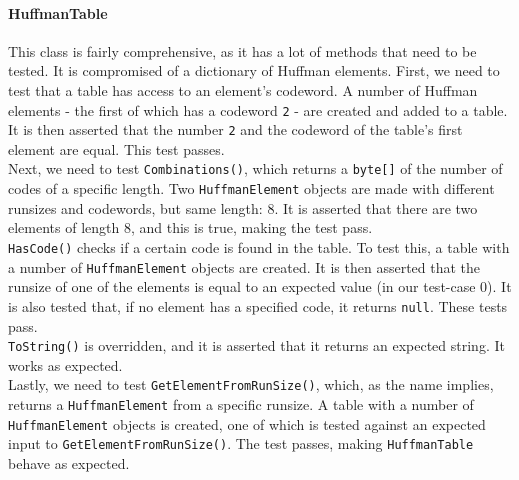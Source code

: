 \paragraph*{HuffmanTable}
This class is fairly comprehensive, as it has a lot of methods that need to be tested.
It is compromised of a dictionary of Huffman elements.
First, we need to test that a table has access to an element's codeword.
A number of Huffman elements - the first of which has a codeword \lstinline|2| - are created and added to a table.
It is then asserted that the number \lstinline|2| and the codeword of the table's first element are equal.
This test passes.\\
Next, we need to test \lstinline|Combinations()|, which returns a \lstinline|byte[]| of the number of codes of a specific length.
Two \lstinline|HuffmanElement| objects are made with different runsizes and codewords, but same length: 8.
It is asserted that there are two elements of length 8, and this is true, making the test pass.\\
\lstinline|HasCode()| checks if a certain code is found in the table.
To test this, a table with a number of \lstinline|HuffmanElement| objects are created.
It is then asserted that the runsize of one of the elements is equal to an expected value (in our test-case 0).
It is also tested that, if no element has a specified code, it returns \lstinline|null|.
These tests pass.\\
\lstinline|ToString()| is overridden, and it is asserted that it returns an expected string.
It works as expected.\\
Lastly, we need to test \lstinline|GetElementFromRunSize()|, which, as the name implies, returns a \lstinline|HuffmanElement| from a specific runsize.
A table with a number of \lstinline|HuffmanElement| objects is created, one of which is tested against an expected input to \lstinline|GetElementFromRunSize()|.
The test passes, making \lstinline|HuffmanTable| behave as expected.

